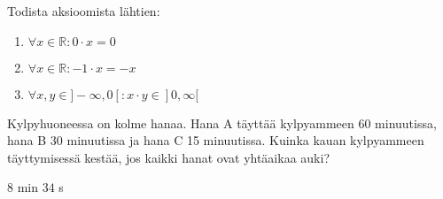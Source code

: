 \begin{tehtava}
Todista aksioomista lähtien:
\begin{enumerate}[(1)]
\item $\forall x \in \mathbb{R}: 0 \cdot x = 0$
\item $\forall x \in \mathbb{R}: -1 \cdot x = -x$
\item $\forall x, y \in ]-\infty,0[: x \cdot y \in ]0,\infty[$
\end{enumerate}
\begin{vastaus}
\begin{enumerate}[(1)]
\end{enumerate}
\end{vastaus}
\end{tehtava}

\begin{tehtava}
Kylpyhuoneessa on kolme hanaa. Hana A täyttää kylpyammeen 60 minuutissa, hana B 30 minuutissa ja hana C 15 minuutissa. Kuinka kauan kylpyammeen täyttymisessä kestää, jos kaikki hanat ovat yhtäaikaa auki?
\begin{vastaus}
$8$ min $34$ s
\end{vastaus}
\end{tehtava}
